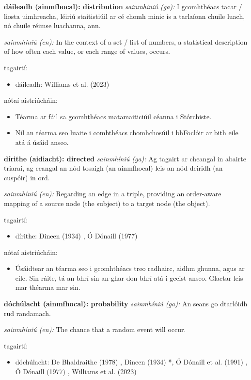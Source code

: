 \documentclass{article}
\begin{document}
\textbf{dáileadh (ainmfhocal): distribution}
\textit{sainmhíniú (ga):} I gcomhthéacs tacar / liosta uimhreacha, léiriú staitistiúil ar cé chomh minic is a tarlaíonn chuile luach, nó chuile réimse luachanna, ann.

\textit{sainmhíniú (en):} In the context of a set / list of numbers, a statistical description of how often each value, or each range of values, occurs.

tagairtí:
\begin{itemize}
	\item dáileadh: Williams et al. (2023) \cite{storchiste}
\end{itemize}

nótaí aistriúcháin:
\begin{itemize}
	\item Téarma ar fáil sa gcomhthéacs matamaiticiúil céanna i Stórchiste.
	\item Níl an téarma seo luaite i comhthéacs chomhchosúil i bhFoclóir ar bith eile atá á úsáid anseo.
\end{itemize}


\textbf{dírithe (aidiacht): directed}
\textit{sainmhíniú (ga):} Ag tagairt ar cheangal in abairte triaraí, ag ceangal an nód tosaigh (an ainmfhocal) leis an nód deiridh (an cuspóir) in ord.

\textit{sainmhíniú (en):} Regarding an edge in a triple, providing an order-aware mapping of a source node (the subject) to a target node (the object).

tagairtí:
\begin{itemize}
	\item dírithe: Dineen (1934) \cite{dineen}, Ó Dónaill (1977) \cite{odonaill}
\end{itemize}

nótaí aistriúcháin:
\begin{itemize}
	\item Úsáidtear an téarma seo i gcomhthéacs treo radhairc, aidhm ghunna, agus ar eile. Sin ráite, tá an bhrí sin an-ghar don bhrí atá i gceist anseo. Glactar leis mar théarma mar sin.
\end{itemize}


\textbf{dóchúlacht (ainmfhocal): probability}
\textit{sainmhíniú (ga):} An seans go dtarlóidh rud randamach.

\textit{sainmhíniú (en):} The chance that a random event will occur.

tagairtí:
\begin{itemize}
	\item dóchúlacht: De Bhaldraithe (1978) \cite{de-bhaldraithe}, Dineen (1934) \cite{dineen}*, Ó Dónaill et al. (1991) \cite{focloir-beag}, Ó Dónaill (1977) \cite{odonaill}, Williams et al. (2023) \cite{storchiste}
\end{itemize}
\end{document}
